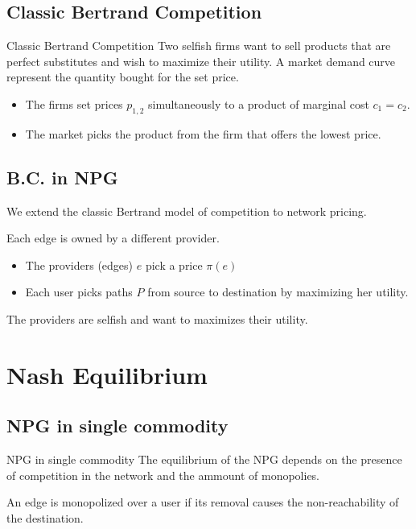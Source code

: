 \documentclass{beamer}
\begin{document}
\subsection{Classic Bertrand Competition}

\begin{frame}{Classic Bertrand Competition}
  Two selfish firms want to sell products that are perfect substitutes and wish to maximize their utility.
  A market demand curve represent the quantity bought for the set price.
  \begin{itemize}
  \item The firms set prices $p_{1,2}$ simultaneously to a product of marginal cost $c_1=c_2$.
  \item The market picks the product from the firm that offers the lowest price.
  \end{itemize}
\end{frame}


\subsection{B.C. in NPG}

\begin{frame}
  We extend the classic Bertrand model of competition to network pricing.

  
  Each edge is owned by a different provider.
  \begin{itemize}
  \item The providers (edges) $e$ pick a price $\pi(e)$
  \item Each user picks paths $P$ from source to destination by maximizing her utility.
  \end{itemize}
  The providers are selfish and want to maximizes their utility.
\end{frame}


\section{Nash Equilibrium}

\subsection{NPG in single commodity}

\begin{frame}{NPG in single commodity}
  The equilibrium of the NPG depends on the presence of competition in the network and the ammount of monopolies.
  \begin{definition}[Monopoly]
    An edge is monopolized over a user if its removal causes the non-reachability of the destination.
  \end{definition}
\end{frame}
\end{document}
